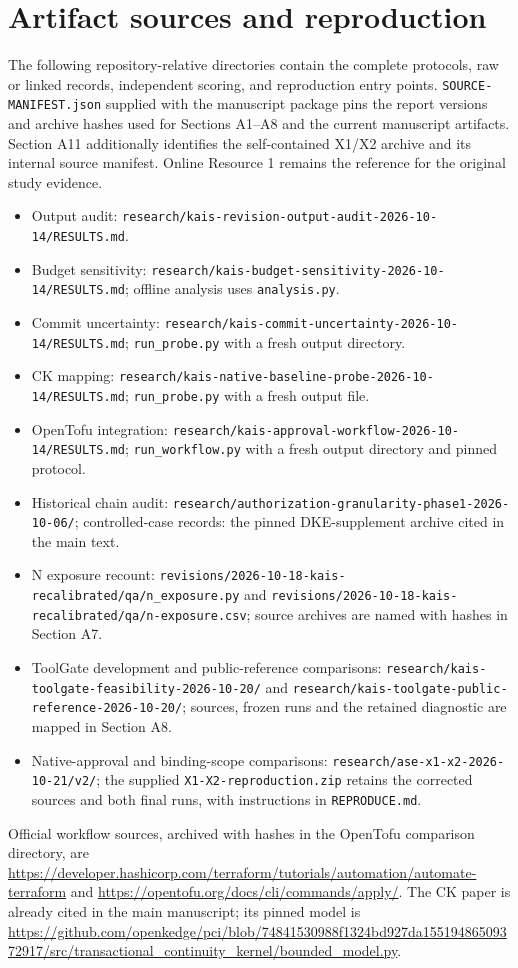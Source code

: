 \documentclass[10pt,a4paper]{article}
\begin{document}
\section*{Artifact sources and reproduction}
The following repository-relative directories contain the complete protocols, raw or linked records, independent scoring, and reproduction entry points. \texttt{SOURCE-MANIFEST.json} supplied with the manuscript package pins the report versions and archive hashes used for Sections A1--A8 and the current manuscript artifacts. Section A11 additionally identifies the self-contained X1/X2 archive and its internal source manifest. Online Resource 1 remains the reference for the original study evidence.
\begin{itemize}
\item Output audit: \nolinkurl{research/kais-revision-output-audit-2026-10-14/RESULTS.md}.
\item Budget sensitivity: \nolinkurl{research/kais-budget-sensitivity-2026-10-14/RESULTS.md}; offline analysis uses \texttt{analysis.py}.
\item Commit uncertainty: \nolinkurl{research/kais-commit-uncertainty-2026-10-14/RESULTS.md}; \texttt{run\_probe.py} with a fresh output directory.
\item CK mapping: \nolinkurl{research/kais-native-baseline-probe-2026-10-14/RESULTS.md}; \texttt{run\_probe.py} with a fresh output file.
\item OpenTofu integration: \nolinkurl{research/kais-approval-workflow-2026-10-14/RESULTS.md}; \texttt{run\_workflow.py} with a fresh output directory and pinned protocol.
\item Historical chain audit: \nolinkurl{research/authorization-granularity-phase1-2026-10-06/}; controlled-case records: the pinned DKE-supplement archive cited in the main text.
\item N exposure recount: \nolinkurl{revisions/2026-10-18-kais-recalibrated/qa/n_exposure.py} and \nolinkurl{revisions/2026-10-18-kais-recalibrated/qa/n-exposure.csv}; source archives are named with hashes in Section A7.
\item ToolGate development and public-reference comparisons: \nolinkurl{research/kais-toolgate-feasibility-2026-10-20/} and \nolinkurl{research/kais-toolgate-public-reference-2026-10-20/}; sources, frozen runs and the retained diagnostic are mapped in Section A8.
\item Native-approval and binding-scope comparisons: \nolinkurl{research/ase-x1-x2-2026-10-21/v2/}; the supplied \texttt{X1-X2-reproduction.zip} retains the corrected sources and both final runs, with instructions in \texttt{REPRODUCE.md}.
\end{itemize}
Official workflow sources, archived with hashes in the OpenTofu comparison directory, are \url{https://developer.hashicorp.com/terraform/tutorials/automation/automate-terraform} and \url{https://opentofu.org/docs/cli/commands/apply/}. The CK paper is already cited in the main manuscript; its pinned model is \url{https://github.com/openkedge/pci/blob/74841530988f1324bd927da15519486509372917/src/transactional_continuity_kernel/bounded_model.py}.
\end{document}

